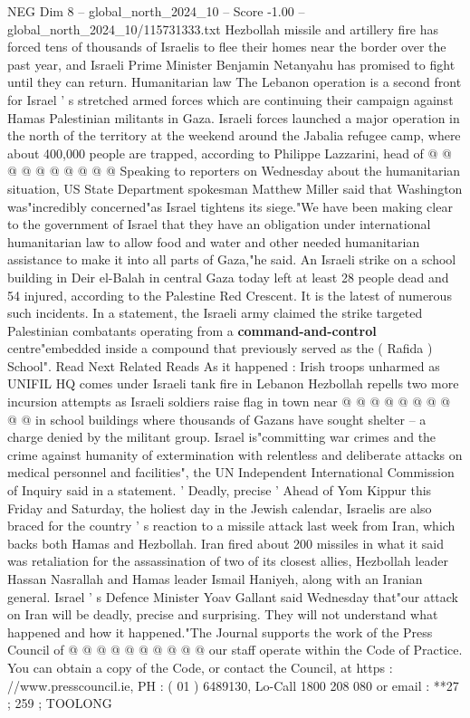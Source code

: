 \begin{textsample}{NEG Dim 8 – global\_north\_2024\_10 – Score -1.00 – global\_north\_2024\_10/115731333.txt}
Hezbollah missile and artillery fire has forced tens of thousands of Israelis to flee their homes near the border over the past year, and Israeli Prime Minister Benjamin Netanyahu has promised to fight until they can return.
Humanitarian law The Lebanon operation is a second front for Israel ' s stretched armed forces which are continuing their campaign against Hamas Palestinian militants in Gaza.
Israeli forces launched a major operation in the north of the territory at the weekend around the Jabalia refugee camp, where about 400,000 people are trapped, according to Philippe Lazzarini, head of @ @ @ @ @ @ @ @ @ @ Speaking to reporters on Wednesday about the humanitarian situation, US State Department spokesman Matthew Miller said that Washington was"incredibly concerned"as Israel tightens its siege."We have been making clear to the government of Israel that they have an obligation under international humanitarian law to allow food and water and other needed humanitarian assistance to make it into all parts of Gaza,"he said.
An Israeli strike on a school building in Deir el-Balah in central Gaza today left at least 28 people dead and 54 injured, according to the Palestine Red Crescent.
It is the latest of numerous such incidents.
In a statement, the Israeli army claimed the strike targeted Palestinian combatants operating from a \textbf{command-and-control} centre"embedded inside a compound that previously served as the ( Rafida ) School".
Read Next Related Reads As it happened : Irish troops unharmed as UNIFIL HQ comes under Israeli tank fire in Lebanon Hezbollah repells two more incursion attempts as Israeli soldiers raise flag in town near @ @ @ @ @ @ @ @ @ @ in school buildings where thousands of Gazans have sought shelter -- a charge denied by the militant group.
Israel is"committing war crimes and the crime against humanity of extermination with relentless and deliberate attacks on medical personnel and facilities", the UN Independent International Commission of Inquiry said in a statement. ' Deadly, precise ' Ahead of Yom Kippur this Friday and Saturday, the holiest day in the Jewish calendar, Israelis are also braced for the country ' s reaction to a missile attack last week from Iran, which backs both Hamas and Hezbollah.
Iran fired about 200 missiles in what it said was retaliation for the assassination of two of its closest allies, Hezbollah leader Hassan Nasrallah and Hamas leader Ismail Haniyeh, along with an Iranian general.
Israel ' s Defence Minister Yoav Gallant said Wednesday that"our attack on Iran will be deadly, precise and surprising.
They will not understand what happened and how it happened."The Journal supports the work of the Press Council of @ @ @ @ @ @ @ @ @ @ our staff operate within the Code of Practice.
You can obtain a copy of the Code, or contact the Council, at https : //www.presscouncil.ie, PH : ( 01 ) 6489130, Lo-Call 1800 208 080 or email : **27 ; 259 ; TOOLONG

\end{textsample}
